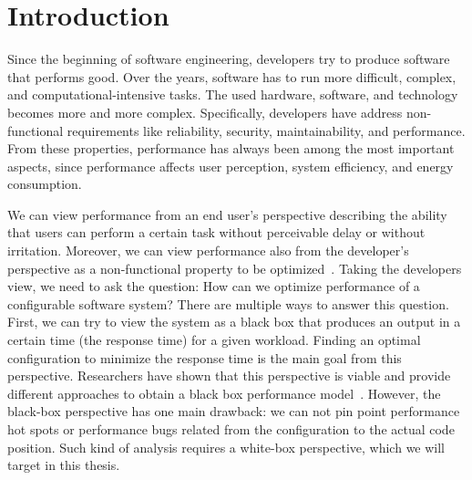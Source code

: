 \chapter{Introduction}
\label{chap:introduction}

Since the beginning of software engineering, developers try to produce software that performs good. 
Over the years, software has to run more difficult, complex, and computational-intensive tasks. 
The used hardware, software, and technology becomes more and more complex.
Specifically, developers have address non-functional requirements like reliability, security, maintainability, and performance. 
From these properties, performance has always been among the most important aspects, since performance affects user perception, system efficiency, and energy consumption.

We can view performance from an end user's perspective describing the ability that users can perform a certain task without perceivable delay or without irritation.
Moreover, we can view performance also from the developer's perspective as a non-functional property to be optimized~\cite{Molyneaux:2009:AAP:1550832}.
Taking the developers view, we need to ask the question: How can we optimize performance of a configurable software system? There are multiple ways to answer this question. First, we can try to view the system as a black box that produces an output in a certain time (the response time) for a given workload. Finding an optimal configuration to minimize the response time is the main goal from this perspective. Researchers have shown that this perspective is viable and provide different approaches to obtain a black box performance model~\cite{Molyneaux:2009:AAP:1550832,weber2005key,siegmund2015performance,smith1993software}. However, the black-box perspective has one main drawback: we can not pin point performance hot spots or performance bugs related from the configuration to the actual code position. Such kind of analysis requires a white-box perspective, which we will target in this thesis.


